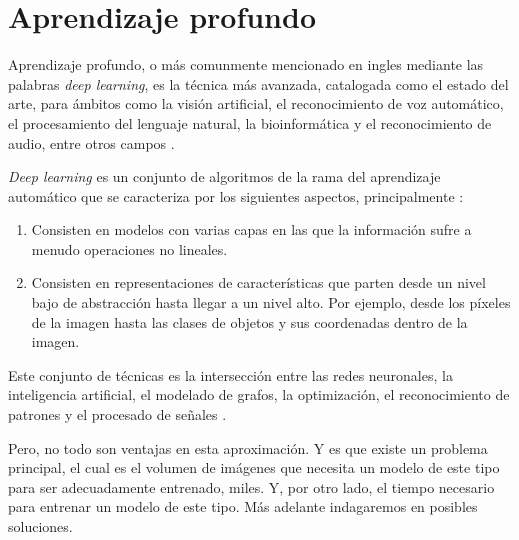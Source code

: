 

\section{Aprendizaje profundo}

Aprendizaje profundo, o más comunmente mencionado en ingles mediante las palabras \textit{deep learning}, es la técnica más avanzada, catalogada como el estado del arte, para ámbitos como la visión artificial, el reconocimiento de voz automático, el procesamiento del lenguaje natural,  la bioinformática y el reconocimiento de audio, entre otros campos \cite{ms:deeplearning}.

\textit{Deep learning} es un conjunto de algoritmos de la rama del aprendizaje automático que se caracteriza por los siguientes aspectos, principalmente \cite{ms:deeplearning}:

\begin{enumerate}
	\item Consisten en modelos con varias capas en las que la información sufre a menudo operaciones no lineales.
	\item Consisten en representaciones de características que parten desde un nivel bajo de abstracción hasta llegar a un nivel alto. Por ejemplo, desde los píxeles de la imagen hasta las clases de objetos y sus coordenadas dentro de la imagen.
\end{enumerate}

Este conjunto de técnicas es la intersección entre las redes neuronales, la inteligencia artificial, el modelado de grafos, la optimización, el reconocimiento de patrones y el procesado de señales \cite{ms:deeplearning}. %

Pero, no todo son ventajas en esta aproximación. Y es que existe un problema principal, el cual es el volumen de imágenes que necesita un modelo de este tipo para ser adecuadamente entrenado, miles. Y, por otro lado, el tiempo necesario para entrenar un modelo de este tipo. Más adelante indagaremos en posibles soluciones.

